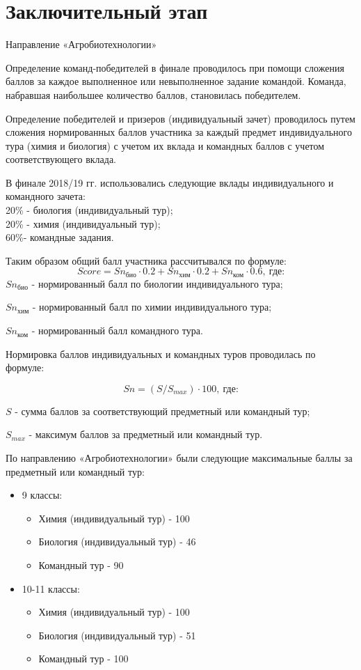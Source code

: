 \section{Заключительный этап}

Направление «Агробиотехнологии»

Определение команд-победителей в финале проводилось при помощи сложения баллов за каждое выполненное или невыполненное задание командой. Команда, набравшая наибольшее количество баллов, становилась победителем.

Определение победителей и призеров (индивидуальный зачет) проводилось путем сложения нормированных баллов участника за каждый предмет индивидуального тура (химия и биология) с учетом их вклада и командных баллов с учетом соответствующего вклада.

В финале 2018/19 гг. использовались следующие вклады индивидуального и командного зачета:\\
20\% - биология (индивидуальный тур); \\
20\% - химия (индивидуальный тур); \\
60\%- командные задания.

Таким образом общий балл участника рассчитывался по формуле:
$$Score = Sn_\text{био} \cdot 0.2 + Sn_\text{хим} \cdot 0.2 + Sn_\text{ком} \cdot 0.6, \: \text{где:}$$
$Sn_\text{био}$ - нормированный балл по биологии индивидуального тура;

$Sn_\text{хим}$ - нормированный балл по химии индивидуального тура;

$Sn_\text{ком}$ - нормированный балл командного тура.

Нормировка баллов индивидуальных и командных туров проводилась по формуле:

$$Sn = (S / S_{max}) \cdot 100, \: \text{где:}$$

$S$ - сумма баллов за соответствующий предметный или командный тур;

$S_{max}$ - максимум баллов за предметный или командный тур.

По направлению «Агробиотехнологии» были следующие максимальные баллы за предметный или командный тур:
\begin{itemize}
    \item 9 классы:
    \begin{itemize}
        \item Химия (индивидуальный тур) - 100 
        \item Биология (индивидуальный тур) - 46
        \item Командный тур - 90
    \end{itemize}
    \item 10-11 классы:
    \begin{itemize}
        \item Химия (индивидуальный тур) - 100
        \item Биология (индивидуальный тур) - 51
        \item Командный тур - 100
    \end{itemize}
\end{itemize}

